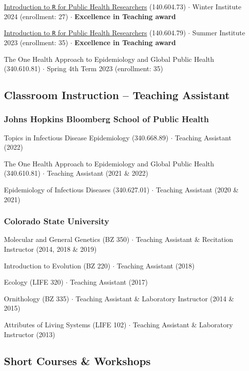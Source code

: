 \documentclass{cv}
\begin{document}
\href{https://jhudatascience.org/intro_to_r/}{Introduction to \texttt{R} for Public Health Researchers} (140.604.73) $\cdot$ Winter Institute 2024 (enrollment: 27) $\cdot$ \textbf{Excellence in Teaching award}

\href{https://jhudatascience.org/intro_to_r/}{Introduction to \texttt{R} for Public Health Researchers} (140.604.79) $\cdot$ Summer Institute 2023 (enrollment: 35) $\cdot$ \textbf{Excellence in Teaching award}

The One Health Approach to Epidemiology and Global Public Health (340.610.81) $\cdot$ Spring 4th Term 2023 (enrollment: 35)

\subsection*{Classroom Instruction -- Teaching Assistant}

\subsubsection*{Johns Hopkins Bloomberg School of Public Health}

Topics in Infectious Disease Epidemiology (340.668.89) $\cdot$ Teaching Assistant (2022)

The One Health Approach to Epidemiology and Global Public Health (340.610.81) $\cdot$ Teaching Assistant (2021 \& 2022)

Epidemiology of Infectious Diseases (340.627.01) $\cdot$ Teaching Assistant (2020 \& 2021)

\subsubsection*{Colorado State University}

Molecular and General Genetics (BZ 350) $\cdot$ Teaching Assistant \& Recitation Instructor (2014, 2018 \& 2019)

Introduction to Evolution (BZ 220) $\cdot$ Teaching Assistant (2018)

Ecology (LIFE 320) $\cdot$ Teaching Assistant (2017)

Ornithology (BZ 335) $\cdot$ Teaching Assistant \& Laboratory Instructor (2014 \& 2015)

Attributes of Living Systems (LIFE 102) $\cdot$ Teaching Assistant \& Laboratory Instructor (2013)

\subsection*{Short Courses \& Workshops}
\end{document}
